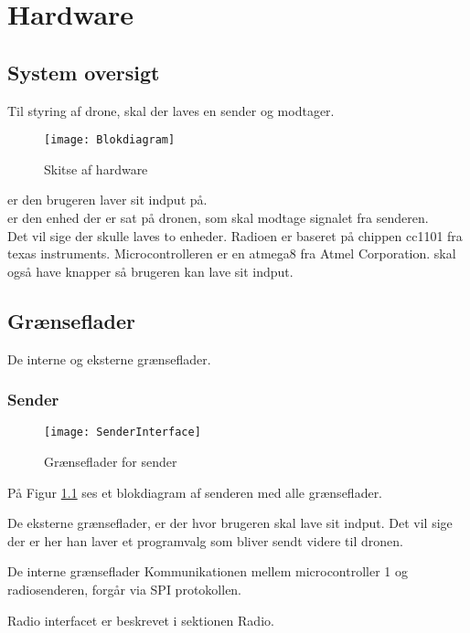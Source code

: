 \documentclass[Main]{subfiles}
\begin{document}
\chapter{Hardware}

\section{System oversigt}

Til styring af drone, skal der laves en sender og modtager.

\begin{figure}[H]
\centering
\texttt{[image: Blokdiagram]}
\caption{Skitse af hardware}
\end{figure}

 er den brugeren laver sit indput på. 
\\  er den enhed der er sat på dronen, som skal modtage signalet fra senderen.\\
Det vil sige der skulle laves to enheder. Radioen er baseret på chippen cc1101 fra texas instruments. Microcontrolleren er en atmega8 fra Atmel Corporation.
 skal også have knapper så brugeren kan lave sit indput.

\section{Grænseflader}
De interne og eksterne grænseflader. 

\subsection{Sender}


\begin{figure}[H]
\centering
\texttt{[image: SenderInterface]}
\caption{Grænseflader for sender}
\label{fig: SenderInterface}
\end{figure}

På Figur \ref{fig: SenderInterface} ses et blokdiagram af senderen med alle grænseflader.

De eksterne grænseflader, er der hvor brugeren skal lave sit indput. Det vil sige der er her han laver et programvalg som bliver sendt videre til dronen.

De interne grænseflader
Kommunikationen mellem microcontroller 1 og radiosenderen, forgår via SPI protokollen. 

Radio interfacet er beskrevet i sektionen Radio.
\end{document}
